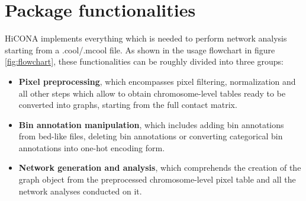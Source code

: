 \section{Package functionalities}
HiCONA implements everything which is needed to perform network analysis starting from a .cool/.mcool file. As shown in the usage flowchart in figure \ref{fig:flowchart}, these functionalities can be roughly divided into three groups:
\begin{itemize}\tightlist
  \item \textbf{Pixel preprocessing}, which encompasses pixel filtering, normalization and all other steps which allow to obtain chromosome-level tables ready to be converted into graphs, starting from the full contact matrix.
  \item \textbf{Bin annotation manipulation}, which includes adding bin annotations from bed-like files, deleting bin annotations or converting categorical bin annotations into one-hot encoding form.
  \item \textbf{Network generation and analysis}, which comprehends the creation of the graph object from the preprocessed chromosome-level pixel table and all the network analyses conducted on it.
\end{itemize} 

